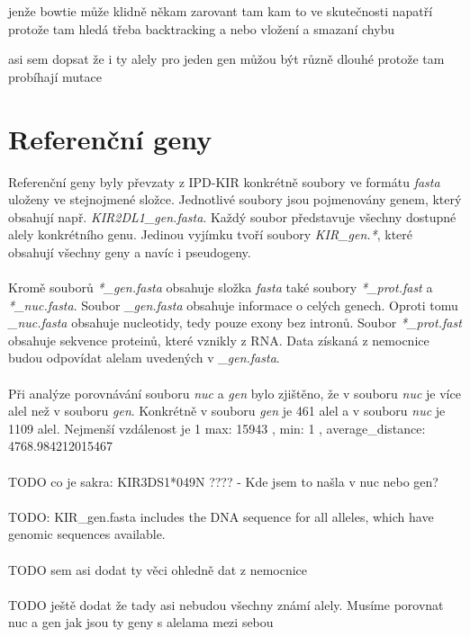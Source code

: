 \documentclass[czech,DP]{thesiskiv}
\numberwithin{equation}{section}
\begin{document}
jenže bowtie může klidně někam zarovant tam kam to ve skutečnosti napatří protože tam hledá třeba backtracking a nebo vložení a smazaní chybu


asi sem dopsat že i ty alely pro jeden gen můžou být různě dlouhé protože tam probíhají mutace

\section{Referenční geny}
Referenční geny byly převzaty z IPD-KIR \cite{imgt_hla_database} konkrétně soubory ve formátu \textit{fasta} uloženy ve stejnojmené složce. Jednotlivé soubory jsou pojmenovány genem, který obsahují např. \textit{KIR2DL1\_gen.fasta}. Každý soubor představuje všechny dostupné alely konkrétního genu. Jedinou vyjímku tvoří soubory \textit{KIR\_gen.*}, které obsahují všechny geny a navíc i pseudogeny. 
\\
\\
Kromě souborů \textit{*\_gen.fasta} obsahuje složka \textit{fasta} také soubory \textit{*\_prot.fast} a \textit{*\_nuc.fasta}. Soubor \textit{\_gen.fasta} obsahuje informace o celých genech. Oproti tomu \textit{\_nuc.fasta} obsahuje nucleotidy, tedy pouze exony bez intronů. Soubor \textit{*\_prot.fast} obsahuje sekvence proteinů, které vznikly z RNA. Data získaná z nemocnice budou odpovídat alelam uvedených v \textit{\_gen.fasta}. 
\\
\\
Při analýze porovnávání souboru \textit{nuc} a \textit{gen} bylo zjištěno, že v souboru \textit{nuc} je více alel než v souboru \textit{gen}. Konkrétně v souboru \textit{gen} je 461 alel a v souboru \textit{nuc} je 1109 alel. Nejmenší vzdálenost je 1
max:  15943 , min:  1 , average_distance:  4768.984212015467
\\
\\
TODO co je sakra:  KIR3DS1*049N ???? - Kde jsem to našla v nuc nebo gen?
\\
\\
TODO: KIR\_gen.fasta  includes the DNA sequence for all alleles, which have genomic sequences available.
\\
\\
TODO sem asi dodat ty věci ohledně dat z nemocnice
\\
\\
TODO ještě dodat že tady asi nebudou všechny známí alely.
Musíme porovnat nuc a gen jak jsou ty geny s alelama mezi sebou
\end{document}

